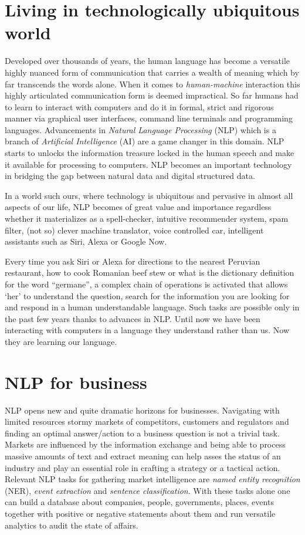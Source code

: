 
\section{Living in technologically ubiquitous world}
\label{sec:motivation}
Developed over thousands of years, the human language has become a versatile highly nuanced form of communication that carries a wealth of meaning which by far transcends the words alone. When it comes to \textit{human-machine} interaction this highly articulated communication form is deemed impractical. So far humans had to learn to interact with computers and do it in  formal, strict and rigorous manner via graphical user interfaces, command line terminals and programming languages. Advancements in \textit{Natural Language Processing} (NLP) which is a branch of \textit{Artificial Intelligence} (AI) are a game changer in this domain. NLP starts to unlocks the information treasure locked in the human speech and make it available for processing to computers. NLP becomes an important technology in bridging the gap between natural data and digital structured data.

In a world such ours, where technology is ubiquitous and pervasive in almost all aspects of our life, NLP becomes of great value and importance regardless whether it materializes as a spell-checker, intuitive recommender system, spam filter, (not so) clever machine translator, voice controlled car, intelligent assistants such as Siri, Alexa or Google Now. 

Every time you ask Siri or Alexa for directions to the nearest Peruvian restaurant, how to cook Romanian beef stew or what is the dictionary definition for the word ``germane'', a complex chain of operations is activated that allows `her' to understand the question, search for the information you are looking for and respond in a human understandable language. Such tasks are possible only in the past few years thanks to advances in NLP. Until now we have been interacting with computers in a language they understand rather than us. Now they are learning our language. 

\section{NLP for business}
\label{sec:motivation-business}
NLP opens new and quite dramatic horizons for businesses. Navigating with limited resources stormy markets of competitors, customers and regulators and finding an optimal answer/action to a business question is not a trivial task. 
Markets are influenced by the information exchange and being able to process massive amounts of text and extract meaning can help asses the status of an industry and play an essential role in crafting a strategy or a tactical action. 
Relevant NLP tasks for gathering market intelligence are \textit{named entity recognition} (NER), \textit{event extraction} and \textit{sentence classification}. With these tasks alone one can build a database about companies, people, governments, places, events together with positive or negative statements about them and run versatile analytics to audit the state of affairs.


